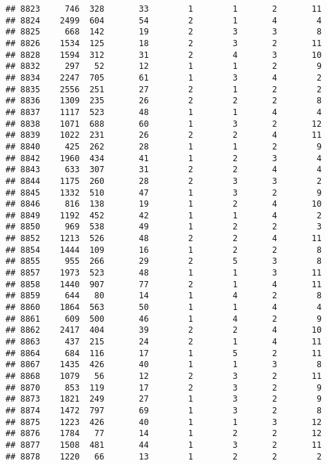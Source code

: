 \documentclass[]{article}
\begin{document}
\begin{verbatim}
## 8823     746  328       33        1        1       2       11
## 8824    2499  604       54        2        1       4        4
## 8825     668  142       19        2        3       3        8
## 8826    1534  125       18        2        3       2       11
## 8828    1594  312       31        2        4       3       10
## 8832     297   52       12        1        1       2        9
## 8834    2247  705       61        1        3       4        2
## 8835    2556  251       27        2        1       2        2
## 8836    1309  235       26        2        2       2        8
## 8837    1117  523       48        1        1       4        4
## 8838    1071  688       60        1        3       2       12
## 8839    1022  231       26        2        2       4       11
## 8840     425  262       28        1        1       2        9
## 8842    1960  434       41        1        2       3        4
## 8843     633  307       31        2        2       4        4
## 8844    1175  260       28        2        3       3        2
## 8845    1332  510       47        1        3       2        9
## 8846     816  138       19        1        2       4       10
## 8849    1192  452       42        1        1       4        2
## 8850     969  538       49        1        2       2        3
## 8852    1213  526       48        2        2       4       11
## 8854    1444  109       16        1        2       2        8
## 8855     955  266       29        2        5       3        8
## 8857    1973  523       48        1        1       3       11
## 8858    1440  907       77        2        1       4       11
## 8859     644   80       14        1        4       2        8
## 8860    1864  563       50        1        1       4        4
## 8861     609  500       46        1        4       2        9
## 8862    2417  404       39        2        2       4       10
## 8863     437  215       24        2        1       4       11
## 8864     684  116       17        1        5       2       11
## 8867    1435  426       40        1        1       3        8
## 8868    1079   56       12        2        3       2       11
## 8870     853  119       17        2        3       2        9
## 8873    1821  249       27        1        3       2        9
## 8874    1472  797       69        1        3       2        8
## 8875    1223  426       40        1        1       3       12
## 8876    1784   77       14        1        2       2       12
## 8877    1508  481       44        1        3       2       11
## 8878    1220   66       13        1        2       2        2

\end{verbatim}
\end{document}
